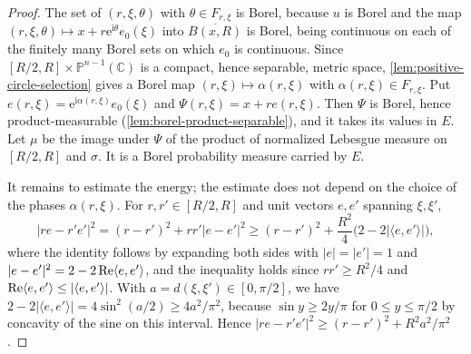 \begin{proof}
The set of $(r,\xi,\theta)$ with $\theta\in F_{r,\xi}$ is Borel, because $u$ is Borel and the map $(r,\xi,\theta)\mapsto x+r\mathrm e^{\mathrm i\theta}e_0(\xi)$ into $\overline{B(x,R)}$ is Borel, being continuous on each of the finitely many Borel sets on which $e_0$ is continuous. Since $[R/2,R]\times\mathbb P^{n-1}(\mathbb C)$ is a compact, hence separable, metric space, \cref{lem:positive-circle-selection} gives a Borel map $(r,\xi)\mapsto\alpha(r,\xi)$ with $\alpha(r,\xi)\in F_{r,\xi}$. Put $e(r,\xi)=\mathrm e^{\mathrm i\alpha(r,\xi)}e_0(\xi)$ and $\Psi(r,\xi)=x+re(r,\xi)$. Then $\Psi$ is Borel, hence product-measurable (\cref{lem:borel-product-separable}), and it takes its values in $E$. Let $\mu$ be the image under $\Psi$ of the product of normalized Lebesgue measure on $[R/2,R]$ and $\sigma$. It is a Borel probability measure carried by $E$.

It remains to estimate the energy; the estimate does not depend on the choice of the phases $\alpha(r,\xi)$. For $r,r'\in[R/2,R]$ and unit vectors $e,e'$ spanning $\xi,\xi'$,
\[
 |re-r'e'|^2=(r-r')^2+rr'|e-e'|^2
 \geq(r-r')^2+\frac{R^2}{4}\bigl(2-2|\langle e,e'\rangle|\bigr),
\]
where the identity follows by expanding both sides with $|e|=|e'|=1$ and $|e-e'|^2=2-2\operatorname{Re}\langle e,e'\rangle$, and the inequality holds since $rr'\geq R^2/4$ and $\operatorname{Re}\langle e,e'\rangle\leq|\langle e,e'\rangle|$. With $a=d(\xi,\xi')\in[0,\pi/2]$, we have $2-2|\langle e,e'\rangle|=4\sin^2(a/2)\geq4a^2/\pi^2$, because $\sin y\geq2y/\pi$ for $0\leq y\leq\pi/2$ by concavity of the sine on this interval. Hence $|re-r'e'|^2\geq(r-r')^2+R^2a^2/\pi^2$.


\end{proof}

